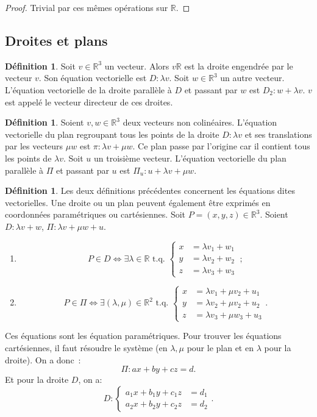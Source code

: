 \documentclass{article}
\newcommand{\R}{\mathbb R}
\newcommand{\tq}{\textrm{ t.q. }}
\theoremstyle{definition}
\newtheorem{déf}[thm]{Définition}
\theoremstyle{remark}
\begin{document}
		\begin{proof} Trivial par ces mêmes opérations sur $\R$. \end{proof}

	\subsection{Droites et plans}
		\begin{déf} Soit $v \in \R^3$ un vecteur. Alors $v\R$ est la droite engendrée par le vecteur $v$. Son équation vectorielle est $D : \lambda v$.
		Soit $w \in \R^3$ un autre vecteur. L'équation vectorielle de la droite parallèle à $D$ et passant par $w$ est $D_2 : w + \lambda v$. $v$ est appelé le
		vecteur directeur de ces droites. \end{déf}

		\begin{déf} Soient $v, w \in \R^3$ deux vecteurs non colinéaires. L'équation vectorielle du plan regroupant tous les points de la droite $D : \lambda v$
		et ses translations par les vecteurs $\mu w$ est $\pi : \lambda v + \mu w$. Ce plan passe par l'origine car il contient tous les points de $\lambda v$.
		Soit $u$ un troisième vecteur. L'équation vectorielle du plan parallèle à $\Pi$ et passant par $u$ est $\Pi_u : u + \lambda v + \mu w$. \end{déf}

		\begin{déf} Les deux définitions précédentes concernent les équations dites vectorielles. Une droite ou un plan peuvent également être exprimés en coordonnées
		paramétriques ou cartésiennes. Soit $P = (x, y, z) \in \R^3$. Soient $D : \lambda v + w$, $\Pi : \lambda v + \mu w + u$.
		\begin{enumerate}
			\item \[P \in D \iff \exists \lambda \in \R \tq \left\{\begin{aligned}x &= \lambda v_1 + w_1 \\y &= \lambda v_2 + w_2 \\z &= \lambda v_3 + w_3\end{aligned}\right.~;\]
			\item \[P \in \Pi \iff \exists (\lambda, \mu) \in \R^2 \tq
			\left\{\begin{aligned}
				x &= \lambda v_1 + \mu v_2 + u_1 \\y &= \lambda v_2 + \mu v_2 + u_2 \\z &= \lambda v_3 + \mu w_3 + u_3
			\end{aligned}\right..\]
		\end{enumerate}

		Ces équations sont les équation paramétriques. Pour trouver les équations cartésiennes, il faut résoudre le système (en $\lambda, \mu$ pour le plan et en $\lambda$
		pour la droite). On a donc~: \[\Pi : ax + by + cz = d.\] Et pour la droite $D$, on a:
		\[D : \left\{\begin{aligned}a_1x + b_1y + c_1z &= d_1 \\a_2x + b_2y + c_2z &= d_2\end{aligned}\right..\] \end{déf}
\end{document}
